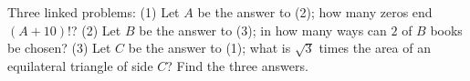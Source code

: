 Three linked problems: (1) Let $A$ be the answer to (2); how many zeros end $(A+10)!$? (2) Let $B$ be the answer to (3); in how many ways can $2$ of $B$ books be chosen? (3) Let $C$ be the answer to (1); what is $\sqrt3$ times the area of an equilateral triangle of side $C$? Find the three answers.
